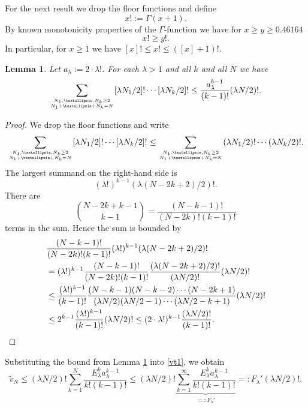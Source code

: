 \documentclass[12pt]{amsart}
\newtheorem{lem}[thm]{Lemma}
\theoremstyle{definition}
\numberwithin{equation}{section}
\renewcommand{\tilde}{\widetilde}
\theoremstyle{definition} %
\theoremstyle{remark}
\begin{document}
For the next result we drop the floor functions and define
\[
x! := \Gamma(x+1).
\]
By known monotonicity properties of the $\Gamma$-function we have for $x\geq y\geq 0.46164$
\[
x! \geq y!.
\]
In particular, for $x\geq 1$ we have $[x]!\leq x! \leq ([x]+1)!$.


\begin{lem} \label{22}
Let $a_\lambda:=2\cdot \lambda!$.
For each $\lambda>1$ and all $k$ and all $N$ we have
\[
    \sum_{N_1,\dots,N_k \geq 2\atop N_1+\dots+N_k =N}
    [\lambda N_1/2]! \cdots [\lambda N_k/2]!
    \leq \frac{a_\lambda^{k-1}}{(k-1)!} {(\lambda N/2)!}.
\]
\end{lem}
\begin{proof}
We drop the floor functions and write
\[
\sum_{N_1,\dots,N_k \geq 2\atop N_1+\dots+N_k =N}
    [\lambda N_1/2]! \cdots [\lambda N_k/2]!
    \leq 
    \sum_{N_1,\dots,N_k \geq 2\atop N_1+\dots+N_k =N}
    (\lambda N_1/2)! \cdots (\lambda N_k/2)!.
\]
The largest summand on the right-hand side is
\[
        (\lambda!)^{k-1} (\lambda (N-2k+2)/2)!.
\]
There are 
\[
\binom{N-2k +k-1}{k-1}
=\frac{(N-k-1)!}{(N-2k)!(k-1)!} 
\]
terms in the sum.
Hence the sum is bounded by 
\begin{align*}
&\frac{(N-k-1)!}{(N-2k)!(k-1)!} (\lambda !)^{k-1} (\lambda (N-2k+2)/2)!
\\&=
(\lambda !)^{k-1}
\frac{(N-k-1)!}{(N-2k)!(k-1)!} \frac{(\lambda (N-2k+2)/2)!}{(\lambda N/2)!} (\lambda N/2)!
\\
&\leq \frac{(\lambda !)^{k-1}}{{(k-1)!}}
    \frac{(N-k-1)(N-k-2)\cdots (N-2k+1)}{(\lambda N/2)(\lambda N/2-1)\cdots (\lambda N/2-k+1)} (\lambda N/2)!
\\&\leq 2^{k-1} \frac{(\lambda !)^{k-1}}{{(k-1)!}}(\lambda N/2)!
\leq (2 \cdot \lambda!)^{k-1} \frac{(\lambda N/2)!}{(k-1)!}. \qedhere
\end{align*}
\end{proof}
Substituting the bound from Lemma \ref{22} into \eqref{vt1}, we obtain 
\[
    \tilde v_{N}
    \leq 
   {(\lambda N/2)!}
    \sum_{k=1}^{N}
\frac {E_\lambda^k a_\lambda^{k-1}} {k!(k-1)!} 
\leq
{(\lambda N/2)!}
\underbrace{\sum_{k=1}^{\infty}\frac {E_\lambda^k a_\lambda^{k-1}} {k!(k-1)!}}_{=:F_\lambda'}
=: F_\lambda' {(\lambda N/2)!}.
\]
\end{document}
